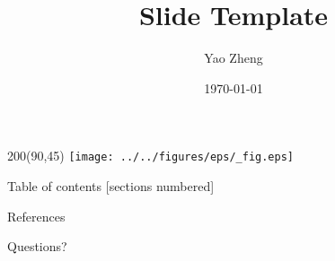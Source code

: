 \documentclass[10pt]{beamer}
\title{Slide Template}
\date{\today}
\author{Yao Zheng}
\institute{Virginia Tech}
\begin{document}
\begin{frame}
   \titlepage
   \begin{textblock}{200}(90,45)
    \texttt{[image: ../../figures/eps/\_fig.eps]}
   \end{textblock}
\end{frame}


\begin{frame}{Table of contents}
  [sections numbered]
  \tableofcontents[hideallsubsections]
\end{frame}

\begin{frame}[allowframebreaks]{References}
\nocite{*}
\printbibliography[heading=none]
\end{frame}

\begin{frame}[standout]
\Huge{Questions?}
\end{frame}
\end{document}
